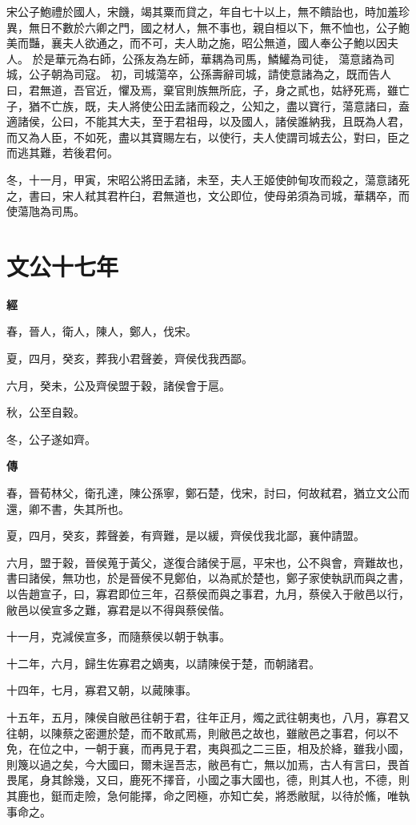 \documentclass{ctexart}
\begin{document}
宋公子鮑禮於國人，宋饑，竭其粟而貸之，年自七十以上，無不饋詒也，時加羞珍異，無日不數於六卿之門，國之材人，無不事也，親自桓以下，無不恤也，公子鮑美而豔，襄夫人欲通之，而不可，夫人助之施，昭公無道，國人奉公子鮑以因夫人。
於是華元為右師，公孫友為左師，華耦為司馬，鱗鱹為司徒，
蕩意諸為司城，公子朝為司寇。
初，司城蕩卒，公孫壽辭司城，請使意諸為之，既而告人曰，君無道，吾官近，懼及焉，棄官則族無所庇，子，身之貳也，姑紓死焉，雖亡子，猶不亡族，既，夫人將使公田孟諸而殺之，公知之，盡以寶行，蕩意諸曰，盍適諸侯，公曰，不能其大夫，至于君祖母，以及國人，諸侯誰納我，且既為人君，而又為人臣，不如死，盡以其寶賜左右，以使行，夫人使謂司城去公，對曰，臣之而逃其難，若後君何。

冬，十一月，甲寅，宋昭公將田孟諸，未至，夫人王姬使帥甸攻而殺之，蕩意諸死之，書曰，宋人弒其君杵臼，君無道也，文公即位，使母弟須為司城，華耦卒，而使蕩虺為司馬。





\section{文公十七年}


\textbf{經}



春，晉人，衛人，陳人，鄭人，伐宋。

夏，四月，癸亥，葬我小君聲姜，齊侯伐我西鄙。

六月，癸未，公及齊侯盟于穀，諸侯會于扈。

秋，公至自穀。

冬，公子遂如齊。

\textbf{傳}



春，晉荀林父，衛孔達，陳公孫寧，鄭石楚，伐宋，討曰，何故弒君，猶立文公而還，卿不書，失其所也。

夏，四月，癸亥，葬聲姜，有齊難，是以緩，齊侯伐我北鄙，襄仲請盟。

六月，盟于穀，晉侯蒐于黃父，遂復合諸侯于扈，平宋也，公不與會，齊難故也，書曰諸侯，無功也，於是晉侯不見鄭伯，以為貳於楚也，鄭子家使執訊而與之書，以告趙宣子，曰，寡君即位三年，召蔡侯而與之事君，九月，蔡侯入于敝邑以行，敝邑以侯宣多之難，寡君是以不得與蔡侯偕。

十一月，克減侯宣多，而隨蔡侯以朝于執事。

十二年，六月，歸生佐寡君之嫡夷，以請陳侯于楚，而朝諸君。

十四年，七月，寡君又朝，以蕆陳事。

十五年，五月，陳侯自敝邑往朝于君，往年正月，燭之武往朝夷也，八月，寡君又往朝，以陳蔡之密邇於楚，而不敢貳焉，則敝邑之故也，雖敝邑之事君，何以不免，在位之中，一朝于襄，而再見于君，夷與孤之二三臣，相及於絳，雖我小國，則篾以過之矣，今大國曰，爾未逞吾志，敝邑有亡，無以加焉，古人有言曰，畏首畏尾，身其餘幾，又曰，鹿死不擇音，小國之事大國也，德，則其人也，不德，則其鹿也，鋌而走險，急何能擇，命之罔極，亦知亡矣，將悉敝賦，以待於鯈，唯執事命之。
\end{document}

